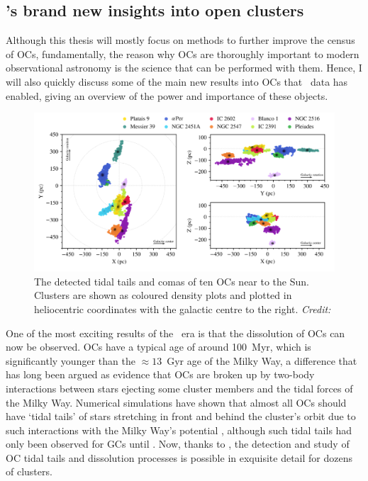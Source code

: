\subsection{\gaia's brand new insights into open clusters}
\label{sec:intro:gaia:insights}

Although this thesis will mostly focus on methods to further improve the census of OCs, fundamentally, the reason why OCs are thoroughly important to modern observational astronomy is the science that can be performed with them. Hence, I will also quickly discuss some of the main new results into OCs that \gaia\ data has enabled, giving an overview of the power and importance of these objects.

\begin{figure}[tb]
	\includegraphics[width=\textwidth]{fig/c1/meingast_tidal_tails.png}
	\caption[The detected tidal tails and comas of ten OCs near to the Sun]{The detected tidal tails and comas of ten OCs near to the Sun. Clusters are shown as coloured density plots and plotted in heliocentric coordinates with the galactic centre to the right. \emph{Credit:} \cite{meingast_extended_2021}}
	\label{fig:intro:gaia:comas}
\end{figure}

One of the most exciting results of the \gaia\ era is that the dissolution of OCs can now be observed. OCs have a typical age of around 100~Myr, which is significantly younger than the $\approx 13$~Gyr age of the Milky Way, a difference that has long been argued as evidence that OCs are broken up by two-body interactions between stars ejecting some cluster members and the tidal forces of the Milky Way. Numerical simulations have shown that almost all OCs should have `tidal tails' of stars stretching in front and behind the cluster's orbit due to such interactions with the Milky Way's potential \citep{portegies_zwart_young_2010,cantat-gaudin_milky_2022}, although such tidal tails had only been observed for GCs until \gaia. Now, thanks to \gaia, the detection and study of OC tidal tails and dissolution processes is possible in exquisite detail for dozens of clusters.


